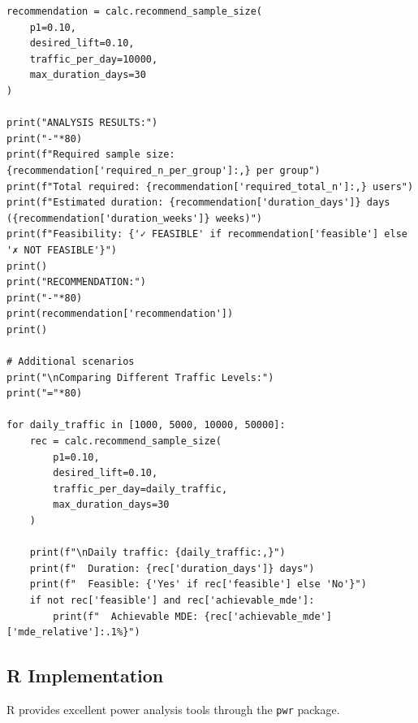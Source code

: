 \begin{lstlisting}
recommendation = calc.recommend_sample_size(
    p1=0.10,
    desired_lift=0.10,
    traffic_per_day=10000,
    max_duration_days=30
)

print("ANALYSIS RESULTS:")
print("-"*80)
print(f"Required sample size: {recommendation['required_n_per_group']:,} per group")
print(f"Total required: {recommendation['required_total_n']:,} users")
print(f"Estimated duration: {recommendation['duration_days']} days ({recommendation['duration_weeks']} weeks)")
print(f"Feasibility: {'✓ FEASIBLE' if recommendation['feasible'] else '✗ NOT FEASIBLE'}")
print()
print("RECOMMENDATION:")
print("-"*80)
print(recommendation['recommendation'])
print()

# Additional scenarios
print("\nComparing Different Traffic Levels:")
print("="*80)

for daily_traffic in [1000, 5000, 10000, 50000]:
    rec = calc.recommend_sample_size(
        p1=0.10,
        desired_lift=0.10,
        traffic_per_day=daily_traffic,
        max_duration_days=30
    )

    print(f"\nDaily traffic: {daily_traffic:,}")
    print(f"  Duration: {rec['duration_days']} days")
    print(f"  Feasible: {'Yes' if rec['feasible'] else 'No'}")
    if not rec['feasible'] and rec['achievable_mde']:
        print(f"  Achievable MDE: {rec['achievable_mde']['mde_relative']:.1%}")
\end{lstlisting}

\subsection{R Implementation}

R provides excellent power analysis tools through the \texttt{pwr} package.

